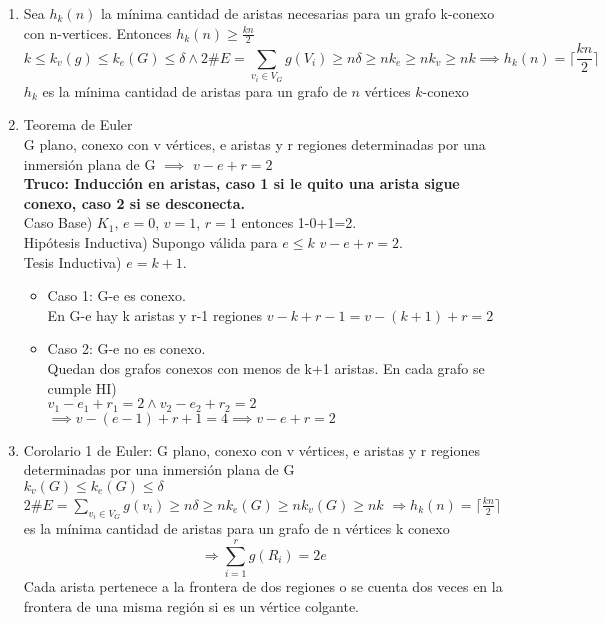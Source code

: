 \documentclass{article}
\begin{document}
\begin{enumerate}
    \item Sea $h_k(n)$ la mínima cantidad de aristas necesarias para un grafo k-conexo con n-vertices. Entonces $h_k(n)\geq\frac{kn}{2}$ \\
    $$k\leq k_v(g)\leq k_e(G)\leq\delta \land 2\#E=\sum_{v_i\in V_G}g(V_i)\geq n\delta\geq nk_e\geq nk_v\geq nk \implies h_k(n)=\lceil\frac{kn}{2}\rceil$$
    $h_k$ es la mínima cantidad de aristas para un grafo de $n$ vértices $k$-conexo
    
    \item Teorema de Euler \\
    G plano, conexo con v vértices, e aristas y r regiones determinadas por una inmersión plana de G $\implies$ $v-e+r=2$ \\
    \textbf{Truco: Inducción en aristas, caso 1 si le quito una arista sigue conexo, caso 2 si se desconecta.} \\
    Caso Base) $K_1$, $e=0$, $v=1$, $r=1$ entonces 1-0+1=2. \\
    Hipótesis Inductiva) Supongo válida para $e\leq k$ $v - e + r = 2$. \\
    Tesis Inductiva) $e=k+1$. 
    \begin{itemize}
        \item Caso 1: G-e es conexo. \\
    En G-e hay k aristas y r-1 regiones $v - k + r - 1 = v - (k + 1) + r = 2$
        \item Caso 2: G-e no es conexo. \\
    Quedan dos grafos conexos con menos de k+1 aristas. En cada grafo se cumple HI) \\
    $v_1 - e_1 + r_1 = 2 \land v_2 - e_2 + r_2 = 2$ \\
    $\implies v - (e - 1) + r + 1 = 4 \implies v - e + r = 2 $
    \end{itemize}
    
    \item Corolario 1 de Euler: G plano, conexo con v vértices, e aristas y r regiones determinadas por una inmersión plana de G \\
    $k_{v}(G) \leq k_{e}(G) \leq \delta$ $2 \# E=\sum_{v_{i} \in V_{G}} g\left(v_{i}\right) \geq n \delta \geq n k_{e}(G) \geq n k_{v}(G) \geq n k$ $\Rightarrow h_{k}(n)=\lceil\frac{k n}{2}\rceil$ es la mínima cantidad de aristas para un grafo de n vértices k conexo
    $$
    \Rightarrow \sum_{i=1}^{r} g\left(R_{i}\right)=2 e
    $$
    Cada arista pertenece a la frontera de dos regiones o se cuenta dos veces en la frontera de una misma región si es un vértice colgante.
    

\end{enumerate}
\end{document}
